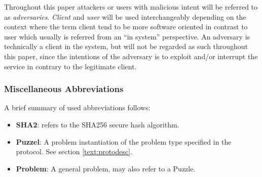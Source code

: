 Throughout this paper attackers or users with malicious intent will be referred to as \emph{adversaries}.
\emph{Client} and \emph{user} will be used interchangeably depending on the context where the term client tend to be more software oriented in contrast to user which usually is referred from an ``in system'' perspective.
An adversary is technically a client in the system, but will not be regarded as such throughout this paper, since the intentions of the adversary is to exploit and/or interrupt the service in contrary to the legitimate client. 

\subsubsection*{Miscellaneous Abbreviations}
A brief summary of used abbreviations follows:
\begin{itemize}
\item {\textbf{ SHA2}}: refers to the SHA256 secure hash algorithm\cite{sha2}.
\item \textbf{ Puzzel}: A problem instantiation of the problem type specified in the protocol. See section \ref{text:protodesc}.
\item \textbf{ Problem}: A general problem, may also refer to a Puzzle.
\end{itemize}
